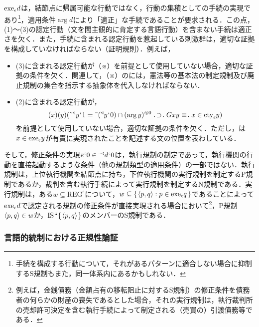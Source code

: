 $ \mathrm{exe}_{\epsilon}{d} $は，結節点に帰属可能な行動ではなく，行動の集積としての手続の実現であり\footnote{
    手続を構成する行動について，それがあるパターンに適合しない場合に抑制するS規制もまた，同一体系内にあるかもしれない．
}，適用条件$ \arg d $により「適正」な手続であることが要求される．この点，(1)〜(3)の認定行動（文を間主観的に肯定する言語行動）を含まない手続は適正さを欠く．また，手続に含まれる認定行動を惹起している刺激群は，適切な証拠を構成していなければならない（証明規則）．例えば，
\begin{itemize}
    \item (3)に含まれる認定行動が（※）を前提として使用していない場合，適切な証拠の条件を欠く．関連して，（※）の\kagi{$ \alpha $}には，憲法等の基本法の制定規制及び廃止規制の集合を指示する抽象体を代入しなければならない．
    \item (2)に含まれる認定行動が，
    \[
        (x)(y)(\tildel{\trgl{y}}\fap 1 = \barl{(\trgl{y}\fap 0)}\cap\msec{(\arg y)}{0}\case{1}{1}{1}Gxy\case{3}{0}{1}x\in \cty{\epsilon}y)
    \]
    を前提として使用していない場合，適切な証拠の条件を欠く．ただし，は$ x\in\mathrm{exe}_{\epsilon} y $が有責に実現されたことを記述する文の位置を表わしている．
\end{itemize}
そして，修正条件の実現$ \tilde{e}{\mspace{1mu}{`}\mspace{1mu}} 0\in \tilde{\:\:}{^\triangleleft}d{\mspace{1mu}{`}\mspace{1mu}} 0 $は，執行規制の制定であって，執行機関の行動を直接起動するような条件（他の規制類型の適用条件）の一部ではない．執行規制は，上位執行機関を結節点に持ち，下位執行機関の実行規制を制定するP規制であるか，裁判を含む執行手続によって実行規制を制定するN規制である．実行規制は，ある$ w\subseteq\mathrm{REG}^\epsilon $について，$ w\subseteq\{\mspace{2mu}\langle p,q \rangle:p\in\mathrm{exe}_{\epsilon}q\mspace{2mu}\} $であることによって$ \mathrm{exe}_{\epsilon}d $で認定される規制の修正条件が直接実現される場合において\footnote{
    例えば，金銭債務（金額占有の移転阻止に対するS規制）の修正条件を債務者の何らかの財産の喪失であるとした場合，それの実行規制は，執行裁判所の売却許可決定を含む執行手続によって制定される（売買の）引渡債務等である．
}，P規制$\langle p,q \rangle\in w$か，$ \mathrm{IS}{\mspace{1mu}{``}\mspace{1mu}}\{\mspace{2mu}\langle p,q \rangle\mspace{2mu}\} $のメンバーのS規制である．

\subsubsection{言語的統制における正規性論証}
\label{sssec:言語的統制における正規性論証}


